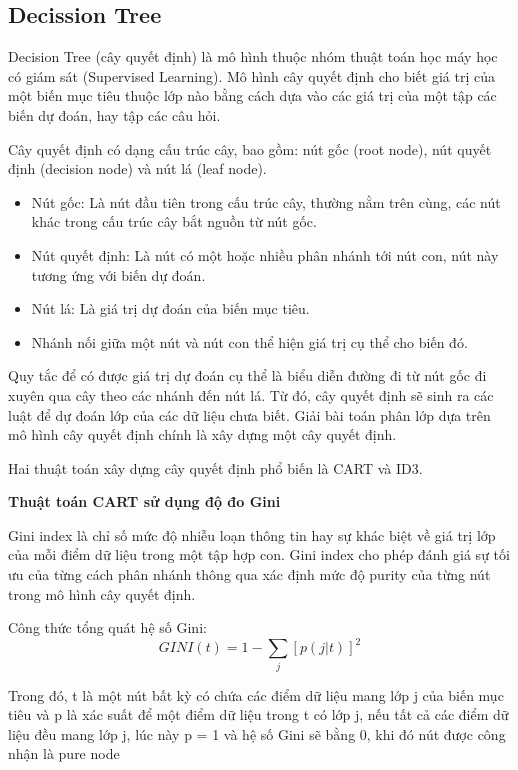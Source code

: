 \documentclass[12pt,a4paper,oneside]{book}
\begin{document}
		\subsection{Decission Tree}
		Decision Tree (cây quyết định) là mô hình thuộc nhóm thuật toán học máy học có giám sát (Supervised Learning). Mô hình cây quyết định cho biết giá trị của một biến mục tiêu thuộc lớp nào bằng cách dựa vào các giá trị của một tập các biến dự đoán, hay tập các câu hỏi.
		
		Cây quyết định có dạng cấu trúc cây, bao gồm: nút gốc (root node), nút quyết định (decision node) và nút lá (leaf node).
		
		\begin{itemize}
		\item Nút gốc: Là nút đầu tiên trong cấu trúc cây, thường nằm trên cùng, các nút khác trong cấu trúc cây bắt nguồn từ nút gốc.
		\item Nút quyết định: Là nút có một hoặc nhiều phân nhánh tới nút con, nút này tương ứng với biến dự đoán.
		\item Nút lá: Là giá trị dự đoán của biến mục tiêu.
		\item Nhánh nối giữa một nút và nút con thể hiện giá trị cụ thể cho biến đó.
		\end{itemize}
		
		Quy tắc để có được giá trị dự đoán cụ thể là biểu diễn đường đi từ nút gốc đi xuyên qua cây theo các nhánh đến nút lá. Từ đó, cây quyết định sẽ sinh ra các luật để dự đoán lớp của các dữ liệu chưa biết. Giải bài toán phân lớp dựa trên mô hình cây quyết định chính là xây dựng một cây quyết định.
		
		Hai thuật toán xây dựng cây quyết định phổ biến là CART và ID3.
		
		\textbf{Thuật toán CART sử dụng độ đo Gini}
		
		Gini index là chỉ số mức độ nhiễu loạn thông tin hay sự khác biệt về giá trị lớp của mỗi điểm dữ liệu trong một tập hợp con. Gini index cho phép đánh giá sự tối ưu của từng cách phân nhánh thông qua xác định mức độ purity của từng nút trong mô hình cây quyết định.
		
		Công thức tổng quát hệ số Gini:
		\begin{equation}
			GINI(t) = 1 - \sum_{j} [p(j|t)]^2
		\end{equation}
	
		Trong đó, t là một nút bất kỳ có chứa các điểm dữ liệu mang lớp j của biến mục tiêu và p là xác suất để một điểm dữ liệu trong t có lớp j, nếu tất cả các điểm dữ liệu đều mang lớp j, lúc này p = 1 và hệ số Gini sẽ bằng 0, khi đó nút được công nhận là pure node
		
\end{document}
